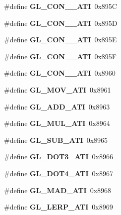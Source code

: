\begin{DoxyCompactItemize}
\item 
\#define {\bfseries G\+L\+\_\+\+C\+O\+N\+\_\+\_\+\+A\+T\+I}~0x895\+C\label{_s_d_l__opengl_8h_ab4070dc1dabaf3487bba710ba5eaa6b7}

\item 
\#define {\bfseries G\+L\+\_\+\+C\+O\+N\+\_\+\_\+\+A\+T\+I}~0x895\+D\label{_s_d_l__opengl_8h_a37dd0cd48d8023c3ef3d90ddcdbb6b88}

\item 
\#define {\bfseries G\+L\+\_\+\+C\+O\+N\+\_\+\_\+\+A\+T\+I}~0x895\+E\label{_s_d_l__opengl_8h_a93e8eb0ed3ee27aa951729516f3227bf}

\item 
\#define {\bfseries G\+L\+\_\+\+C\+O\+N\+\_\+\_\+\+A\+T\+I}~0x895\+F\label{_s_d_l__opengl_8h_a6d2a1b6757cb76d3ada3fd0993a73a1c}

\item 
\#define {\bfseries G\+L\+\_\+\+C\+O\+N\+\_\+\_\+\+A\+T\+I}~0x8960\label{_s_d_l__opengl_8h_a72de3f91d8961e115afa2d5e3598a16c}

\item 
\#define {\bfseries G\+L\+\_\+\+M\+O\+V\+\_\+\+A\+T\+I}~0x8961\label{_s_d_l__opengl_8h_ab5d4fb4c04dd90b7926ca60ed17554cd}

\item 
\#define {\bfseries G\+L\+\_\+\+A\+D\+D\+\_\+\+A\+T\+I}~0x8963\label{_s_d_l__opengl_8h_ad13af4783e71c99c23e4ff25b0c060f9}

\item 
\#define {\bfseries G\+L\+\_\+\+M\+U\+L\+\_\+\+A\+T\+I}~0x8964\label{_s_d_l__opengl_8h_adcd0fbd61ac319b737991b53b94bf82e}

\item 
\#define {\bfseries G\+L\+\_\+\+S\+U\+B\+\_\+\+A\+T\+I}~0x8965\label{_s_d_l__opengl_8h_a19136b45650535634aeee193ac3b3057}

\item 
\#define {\bfseries G\+L\+\_\+\+D\+O\+T3\+\_\+\+A\+T\+I}~0x8966\label{_s_d_l__opengl_8h_ab8259509dab91df9f25931e432941989}

\item 
\#define {\bfseries G\+L\+\_\+\+D\+O\+T4\+\_\+\+A\+T\+I}~0x8967\label{_s_d_l__opengl_8h_ad503bc95b3998bab00bf1d7114c32d2e}

\item 
\#define {\bfseries G\+L\+\_\+\+M\+A\+D\+\_\+\+A\+T\+I}~0x8968\label{_s_d_l__opengl_8h_a8d8562d90ab63ca2ef4da8f583da387e}

\item 
\#define {\bfseries G\+L\+\_\+\+L\+E\+R\+P\+\_\+\+A\+T\+I}~0x8969\label{_s_d_l__opengl_8h_a69a54a83efb7911721d1a2230d0f65bc}


\end{DoxyCompactItemize}

